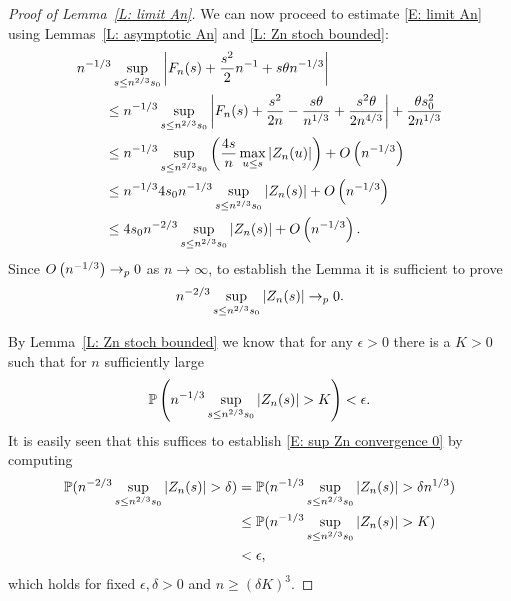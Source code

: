 \begin{proof}[Proof of Lemma~\ref{L: limit An}] \label{P: limit An}
	We can now proceed to estimate \eqref{E: limit An} using Lemmas~\ref{L: asymptotic An} and \ref{L: Zn stoch bounded}:
	\begin{equation}
	\begin{aligned}
	&n^{-1 / 3} \sup_{s \leq n^{2 / 3} s_0 }\left| F_n(s) + \frac{s^2}{2}n^{-1}  + s\theta n^{-1 / 3}  \right| \\
	&\qquad\leq n^{-1 / 3} \sup_{s \leq n^{2 / 3} s_0 } \left| F_n(s) + \frac{s^2}{2n} - \frac{s\theta}{n^{1 / 3}}  + \frac{s^2\theta}{2n^{4 / 3}}  \right| + \frac{\theta s_0^2}{2n^{1 / 3}} \\
	&\qquad\leq n^{-1 / 3} \sup_{s \leq n^{2 / 3} s_0 } \left(\frac{4s}{n} \max_{u \leq s} |Z_n(u)|\right) + O\left(n^{-1 / 3}\right) \\
	&\qquad\leq n^{-1 / 3} 4 s_0 n^{-1 / 3} \sup_{s \leq n^{2 / 3} s_0 } |Z_n(s)| + O\left(n^{-1 / 3}\right) \\
	&\qquad\leq 4 s_0 n^{-2 / 3} \sup_{s \leq n^{2 / 3} s_0 } |Z_n(s)| + O\left(n^{-1 / 3}\right).
	\end{aligned}
	\end{equation}
	Since $O\left(n^{-1 / 3}\right) \rightarrow_p 0$ as $n \rightarrow \infty$, to establish the Lemma it is sufficient to prove
	\begin{equation} \label{E: sup Zn convergence 0}
	n^{-2 / 3} \sup_{s \leq n^{2 / 3} s_0 } |Z_n(s)| \rightarrow_p 0.
	\end{equation}
	
	By Lemma~\ref{L: Zn stoch bounded} we know that for any  $ \epsilon > 0 $  there is a $ K > 0 $
	such that for $n$ sufficiently large 
	\begin{equation}
	\mathbb{P}\left( n^{-1/3} \sup_{s \leq n^{2 / 3} s_0 } |Z_n(s)| > K \right) < \epsilon. 
	\end{equation}
	It is easily seen that this suffices to establish \eqref{E: sup Zn convergence 0} by computing
	\begin{equation*}
	\begin{aligned}
	\mathbb{P}( n^{-2 / 3} \sup_{s \leq n^{2 / 3} s_0 } |Z_n(s)| > \delta)
	&= \mathbb{P}( n^{-1 / 3} \sup_{s \leq n^{2 / 3} s_0 } |Z_n(s)| > \delta n^{1 / 3} ) \\
	&\leq \mathbb{P}( n^{-1 / 3} \sup_{s \leq n^{2 / 3} s_0 } |Z_n(s)| > K) \\
	&< \epsilon,
	\end{aligned}
	\end{equation*}
	which holds for fixed $\epsilon, \delta > 0$ and $n \geq (\delta K)^3$.
\end{proof}


